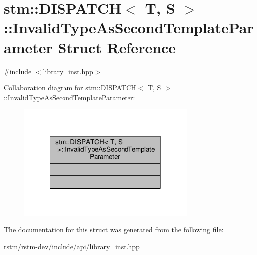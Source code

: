 \hypertarget{structstm_1_1DISPATCH_1_1InvalidTypeAsSecondTemplateParameter}{\section{stm\-:\-:D\-I\-S\-P\-A\-T\-C\-H$<$ T, S $>$\-:\-:Invalid\-Type\-As\-Second\-Template\-Parameter Struct Reference}
\label{structstm_1_1DISPATCH_1_1InvalidTypeAsSecondTemplateParameter}
}


{\ttfamily \#include $<$library\-\_\-inst.\-hpp$>$}



Collaboration diagram for stm\-:\-:D\-I\-S\-P\-A\-T\-C\-H$<$ T, S $>$\-:\-:Invalid\-Type\-As\-Second\-Template\-Parameter\-:
\nopagebreak
\begin{figure}[H]
\begin{center}
\leavevmode
\includegraphics[width=246pt]{structstm_1_1DISPATCH_1_1InvalidTypeAsSecondTemplateParameter__coll__graph}
\end{center}
\end{figure}


The documentation for this struct was generated from the following file\-:\begin{DoxyCompactItemize}
\item 
rstm/rstm-\/dev/include/api/\hyperlink{library__inst_8hpp}{library\-\_\-inst.\-hpp}\end{DoxyCompactItemize}
